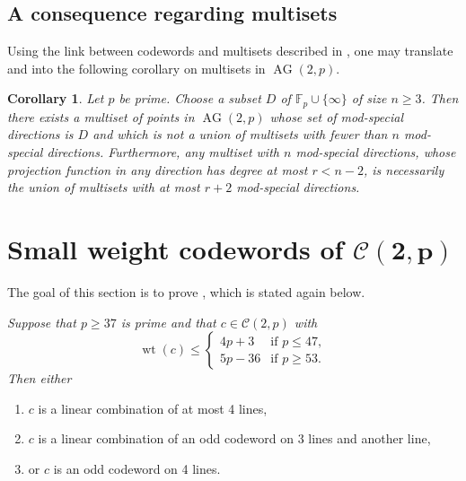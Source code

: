 \documentclass[12pt, a4paper]{article}
\newtheorem{crl}[thm]{Corollary}
\theoremstyle{definition}
\newcommand{\FF}{\mathbb F}
\newcommand{\mc}{\mathcal C}
\newcommand{\sam}[1]{\textcolor{purple}{#1}}
\DeclareMathOperator{\wt}{wt}
\DeclareMathOperator{\AG}{AG}
\newcommand{\ag}{\AG}
\begin{document}
\subsection{A consequence regarding multisets}

Using the link between codewords and multisets described in , one may translate  and  into the following corollary on multisets in $\ag(2,p)$.

\begin{crl}
 \label{Crl:MultisetNotUnion}
 Let $p$ be prime.
 Choose a subset $D$ of $\FF_p \cup \{\infty\}$ of size $n \geq 3$.
 Then there exists a multiset of points in $\ag(2,p)$ whose set of mod-special directions is $D$ and which is not a union of multisets with fewer than $n$ mod-special directions.
Furthermore, any multiset with $n$ mod-special directions, whose projection function in any direction has degree at most $r < n-2$, is necessarily the union of multisets with at most $r+2$ mod-special directions.    
\end{crl}


\section{Small weight codewords of \texorpdfstring{$\boldsymbol{\mathcal C(2,p)}$}{C(2,p)}}
 \label{Sec:Small}

The goal of this section is to prove , which is stated again below.

\bigskip

 {\it
Suppose that $p \geq 37$ is prime and that $c \in \mc(2,p)$ with
\[
 \wt(c) \leq \begin{cases}
  4p+3 & \text{if } p \leq 47, \\
  5p-36 & \text{if } p \geq 53.
 \end{cases}
\]
 Then either
 \begin{enumerate}
  \item $c$ is a linear combination of at most 4 lines,
  \item $c$ is a linear combination of an odd codeword on 3 lines and another line,
  \item or $c$ is an odd codeword on 4 lines.
 \end{enumerate}
}
\end{document}
